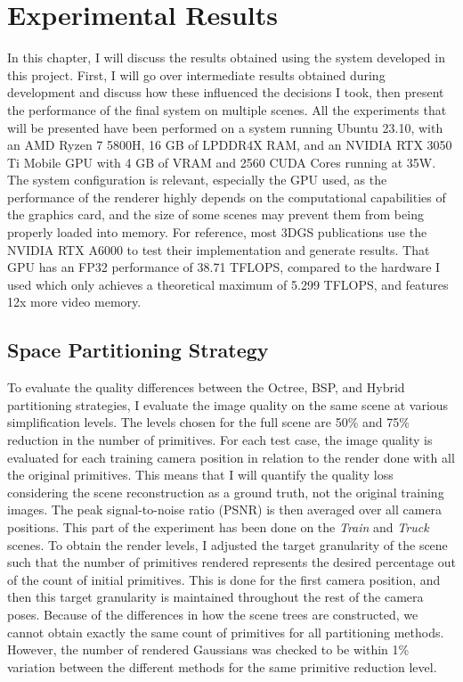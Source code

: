 \section{Experimental Results}

In this chapter, I will discuss the results obtained using the system developed in this project. First, I will go over intermediate results obtained during development and discuss how these influenced the decisions I took, then present the performance of the final system on multiple scenes. All the experiments that will be presented have been performed on a system running Ubuntu 23.10, with an AMD Ryzen 7 5800H, 16 GB of LPDDR4X RAM, and an NVIDIA RTX 3050 Ti Mobile GPU with 4 GB of VRAM and 2560 CUDA Cores running at 35W. The system configuration is relevant, especially the GPU used, as the performance of the renderer highly depends on the computational capabilities of the graphics card, and the size of some scenes may prevent them from being properly loaded into memory. For reference, most 3DGS publications use the NVIDIA RTX A6000 to test their implementation and generate results. That GPU has an FP32 performance of 38.71 TFLOPS, compared to the hardware I used which only achieves a theoretical maximum of 5.299 TFLOPS, and features 12x more video memory.

\subsection{Space Partitioning Strategy}
To evaluate the quality differences between the Octree, BSP, and Hybrid partitioning strategies, I evaluate the image quality on the same scene at various simplification levels. The levels chosen for the full scene are 50\% and 75\% reduction in the number of primitives. For each test case, the image quality is evaluated for each training camera position in relation to the render done with all the original primitives. This means that I will quantify the quality loss considering the scene reconstruction as a ground truth, not the original training images. The peak signal-to-noise ratio (PSNR) is then averaged over all camera positions. This part of the experiment has been done on the \textit{Train} and \textit{Truck} scenes. To obtain the render levels, I adjusted the target granularity of the scene such that the number of primitives rendered represents the desired percentage out of the count of initial primitives. This is done for the first camera position, and then this target granularity is maintained throughout the rest of the camera poses. Because of the differences in how the scene trees are constructed, we cannot obtain exactly the same count of primitives for all partitioning methods. However, the number of rendered Gaussians was checked to be within 1\% variation between the different methods for the same primitive reduction level.

